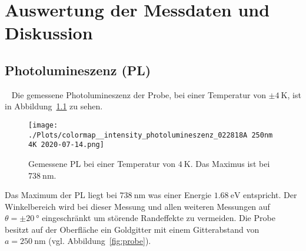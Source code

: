 \chapter{Auswertung der Messdaten und Diskussion}

\section{Photolumineszenz (PL)}~\label{sec:PL}
Die gemessene Photolumineszenz der Probe, bei einer Temperatur
von $\pm \SI{4}{\kelvin}$, ist in Abbildung~\ref{fig:photo} zu sehen.
\begin{figure}
    \centering
    \texttt{[image: ./Plots/colormap\_\_intensity\_photolumineszenz\_022818A 250nm 4K 2020-07-14.png]}
    \caption{Gemessene PL bei einer Temperatur von $\SI{4}{\kelvin}$. Das Maximus ist bei $\SI{738}{\nano\meter}$. }
    \label{fig:photo}
\end{figure}
\FloatBarrier

Das Maximum der PL liegt bei $\SI{738}{\nano\meter}$ was einer Energie $\SI{1,68}{\eV}$ entspricht.
Der Winkelbereich wird bei dieser Messung und allen weiteren Messungen auf $ \theta = \pm \SI{20}{\degree}$ eingeschränkt um 
störende Randeffekte zu vermeiden. 
Die Probe besitzt auf der Oberfläche ein Goldgitter mit einem Gitterabstand 
von $a =\SI{250}{\nano\meter}$ (vgl. Abbildung~\ref{fig:probe}).